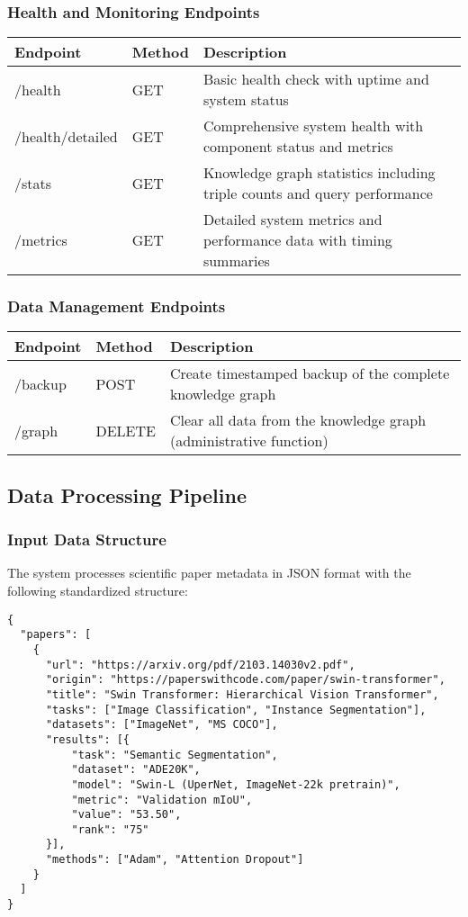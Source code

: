 \documentclass[12pt,a4paper]{article}
\begin{document}
\subsubsection{Health and Monitoring Endpoints}

\begin{longtable}{|p{3cm}|p{2cm}|p{8cm}|}
\hline
\textbf{Endpoint} & \textbf{Method} & \textbf{Description} \\
\hline
\endhead
/health & GET & Basic health check with uptime and system status \\
\hline
/health/detailed & GET & Comprehensive system health with component status and metrics \\
\hline
/stats & GET & Knowledge graph statistics including triple counts and query performance \\
\hline
/metrics & GET & Detailed system metrics and performance data with timing summaries \\
\hline
\end{longtable}

\subsubsection{Data Management Endpoints}

\begin{longtable}{|p{3cm}|p{2cm}|p{8cm}|}
\hline
\textbf{Endpoint} & \textbf{Method} & \textbf{Description} \\
\hline
\endhead
/backup & POST & Create timestamped backup of the complete knowledge graph \\
\hline
/graph & DELETE & Clear all data from the knowledge graph (administrative function) \\
\hline
\end{longtable}

\subsection{Data Processing Pipeline}

\subsubsection{Input Data Structure}

The system processes scientific paper metadata in JSON format with the following standardized structure:

\begin{lstlisting}[caption=Input Data Structure Example]
{
  "papers": [
    {
      "url": "https://arxiv.org/pdf/2103.14030v2.pdf",
      "origin": "https://paperswithcode.com/paper/swin-transformer",
      "title": "Swin Transformer: Hierarchical Vision Transformer",
      "tasks": ["Image Classification", "Instance Segmentation"],
      "datasets": ["ImageNet", "MS COCO"],
      "results": [{
          "task": "Semantic Segmentation",
          "dataset": "ADE20K",
          "model": "Swin-L (UperNet, ImageNet-22k pretrain)",
          "metric": "Validation mIoU",
          "value": "53.50",
          "rank": "75"
      }],
      "methods": ["Adam", "Attention Dropout"]
    }
  ]
}
\end{lstlisting}
\end{document}

